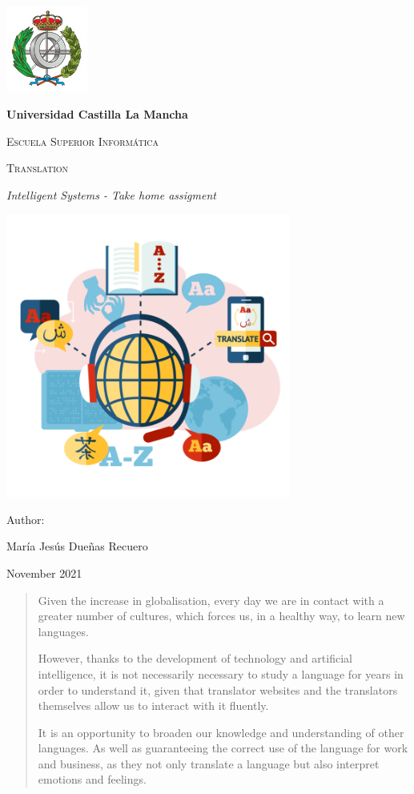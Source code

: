 \documentclass[a4paper]{article}
\theoremstyle{plain}
\theoremstyle{definition}
\begin{document}
\begin{titlepage}
    \centering
     {\includegraphics[width=0.2\textwidth]{logo}\par}
    {\bfseries\LARGE Universidad Castilla La Mancha\par}
    \vspace{1cm}
    {\scshape\Large Escuela Superior Informática\par}
    \vspace{2cm}
    {\scshape\Huge Translation \par}
    {\itshape\Large Intelligent Systems - Take home assigment \par}
    \includegraphics[width=0.7\textwidth]{INTERPRETACION-O1-800x800.png}
    \vfill
    {\Large Author: \par}
    {\Large María Jesús Dueñas Recuero\par}
    \vfill
    {\Large November 2021 \par}
    
   
\end{titlepage}
\begin{abstract}
    Given the increase in globalisation, every day we are in contact with a greater number of cultures, which forces us, in a healthy way, to learn new languages.\newline

	However, thanks to the development of technology and artificial intelligence, it is not necessarily necessary to study a language for years in order to understand it, given that translator websites and the translators themselves allow us to interact with it fluently.\newline

	It is an opportunity to broaden our knowledge and understanding of other languages. As well as guaranteeing the correct use of the language for work and business, as they not only translate a language but also interpret emotions and feelings.
\end{abstract}
\end{document}
